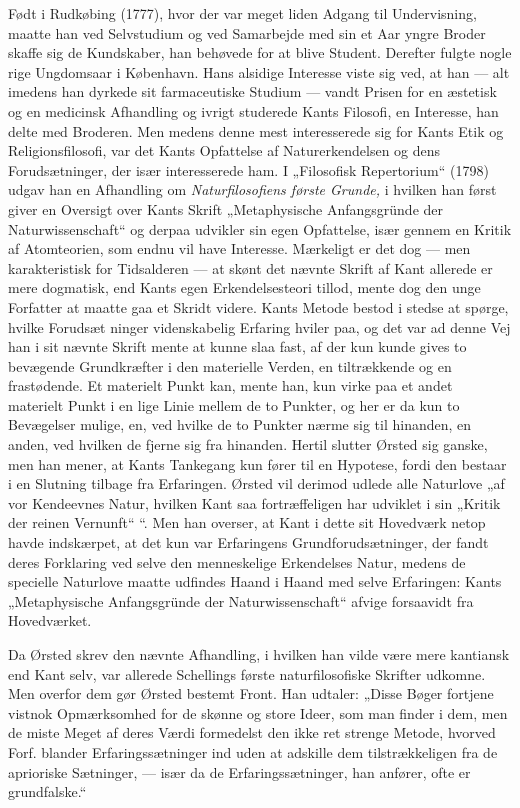 \documentclass[12pt,a4paper,openany]{book}
\newcommand{\opage}[1]{\marginnote{\footnotesize\textit{[#1]}}}
\begin{document}
Født i Rudkøbing (1777), hvor der var meget liden Adgang til Undervisning,
maatte han ved Selvstudium og ved Samarbejde med sin et Aar yngre Broder skaffe
sig de Kundskaber, han behøvede for at blive Student. Derefter fulgte nogle
rige Ungdomsaar i København. Hans alsidige Interesse viste sig ved, at han ---
alt imedens han dyrkede sit farmaceutiske Studium --- vandt Prisen for en
æstetisk og en medicinsk Afhandling og ivrigt studerede Kants Filosofi, en
Interesse, han delte med Broderen. Men medens denne mest interesserede sig for
Kants Etik og Religionsfilosofi, var det Kants Opfattelse af Naturerkendelsen
og dens Forudsætninger, der især interesserede ham. I „Filosofisk Repertorium“
(1798) udgav han en Afhandling om \textit{Naturfilosofiens første Grunde,} i
hvilken han først giver en Oversigt over Kants Skrift „Metaphysische
Anfangsgründe der Naturwissenschaft“ og derpaa udvikler sin egen Opfattelse,
især gennem en Kritik af Atomteorien, som endnu vil have Interesse. Mærkeligt
er det dog --- men karakteristisk for Tidsalderen --- at skønt det nævnte
Skrift af Kant allerede er mere dogmatisk, end Kants egen Erkendelsesteori
tillod, mente dog den unge Forfatter at maatte gaa et Skridt videre. Kants
Metode bestod i stedse at spørge, hvilke Forudsæt%
\setcounter{footnote}{0}%
\opage{50}ninger videnskabelig Erfaring hviler paa, og det var ad denne Vej han
i sit nævnte Skrift mente at kunne slaa fast, af der kun kunde gives to
bevægende Grundkræfter i den materielle Verden, en tiltrækkende og en
frastødende. Et materielt Punkt kan, mente han, kun virke paa et andet
materielt Punkt i en lige Linie mellem de to Punkter, og her er da kun to
Bevægelser mulige, en, ved hvilke de to Punkter nærme sig til hinanden, en
anden, ved hvilken de fjerne sig fra hinanden. Hertil slutter Ørsted sig
ganske, men han mener, at Kants Tankegang kun fører til en Hypotese, fordi den
bestaar i en Slutning tilbage fra Erfaringen. Ørsted vil derimod udlede alle
Naturlove „af vor Kendeevnes Natur, hvilken Kant saa fortræffeligen har
udviklet i sin „Kritik der reinen Vernunft“ “. Men han overser, at Kant i dette
sit Hovedværk netop havde indskærpet, at det kun var Erfaringens
Grundforudsætninger, der fandt deres Forklaring ved selve den menneskelige
Erkendelses Natur, medens de specielle Naturlove maatte udfindes Haand i Haand
med selve Erfaringen: Kants „Metaphysische Anfangsgründe der Naturwissenschaft“
afvige forsaavidt fra Hovedværket.

Da Ørsted skrev den nævnte Afhandling, i hvilken han vilde være mere kantiansk
end Kant selv, var allerede Schellings første naturfilosofiske Skrifter
udkomne. Men overfor dem gør Ørsted bestemt Front. Han udtaler: „Disse Bøger
fortjene vistnok Opmærksomhed for de skønne og store Ideer, som man finder i
dem, men de miste Meget af deres Værdi formedelst den ikke ret strenge Metode,
hvorved Forf. blander Erfaringssætninger ind uden at adskille dem
tilstrækkeligen fra de aprioriske Sætninger, --- især da de Erfaringssætninger,
han anfører, ofte er grundfalske.“
\end{document}
